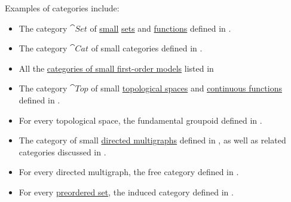 \begin{example}\label{ex:def:category}
  Examples of categories include:

  \begin{itemize}
    \item The category \( \cat{Set} \) of \hyperref[def:large_and_small_sets]{small} \hyperref[def:set]{sets} and \hyperref[def:function]{functions} defined in .

    \item The category \( \cat{Cat} \) of small categories defined in .

    \item All the \hyperref[def:category_of_small_first_order_models]{categories of small first-order models} listed in 

    \item The category \( \cat{Top} \) of small \hyperref[def:topological_space]{topological spaces} and \hyperref[def:global_continuity]{continuous functions} defined in .

    \item For every topological space, the fundamental groupoid defined in .

    \item The category of small \hyperref[def:directed_multigraph]{directed multigraphs} defined in , as well as related categories discussed in .

    \item For every directed multigraph, the free category defined in .

    \item For every \hyperref[def:preordered_set]{preordered set}, the induced category defined in .
  \end{itemize}
\end{example}

